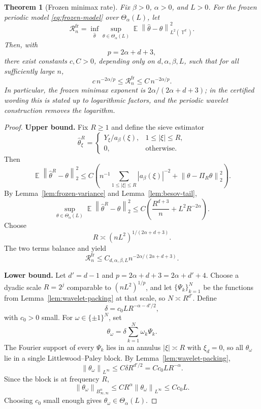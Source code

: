 \documentclass[12pt]{article}
\newtheorem{theorem}{Theorem}[section]
\theoremstyle{remark}
\DeclareMathOperator{\E}{\mathbb E}
\DeclareMathOperator{\T}{\mathbb T}
\newcommand{\norm}[1]{\left\lVert #1\right\rVert}
\newcommand{\asym}{\asymp}
\begin{document}
\begin{theorem}[Frozen minimax rate]
\label{thm:frozen-minimax}
Fix \(\beta>0\), \(\alpha>0\), and \(L>0\). For the frozen periodic model \eqref{eq:frozen-model} over \(\Theta_\alpha(L)\), let
\[
\mathcal R_n^{\mathrm{fr}}
=
\inf_{\widehat\theta}\sup_{\theta\in\Theta_\alpha(L)}
\E\norm{\widehat\theta-\theta}_{L^2(\T^d)}^2.
\]
Then, with
\[
p=2\alpha+d+3,
\]
there exist constants \(c,C>0\), depending only on \(d,\alpha,\beta,L\), such that for all sufficiently large \(n\),
\[
c\,n^{-2\alpha/p}
\le
\mathcal R_n^{\mathrm{fr}}
\le
C\,n^{-2\alpha/p}.
\]
In particular, the frozen minimax exponent is \(2\alpha/(2\alpha+d+3)\); in the certified wording this is stated up to logarithmic factors, and the periodic wavelet construction removes the logarithm.
\end{theorem}
\begin{proof}
\textbf{Upper bound.} Fix \(R\ge1\) and define the sieve estimator
\[
\widehat\theta^R_\xi=
\begin{cases}
Y_\xi/a_\beta(\xi), & 1\le|\xi|\le R,\\
0, & \text{otherwise}.
\end{cases}
\]
Then
\[
\E\norm{\widehat\theta^R-\theta}_2^2
\le
C\left(
n^{-1}\sum_{1\le|\xi|\le R}|a_\beta(\xi)|^{-2}
+
\norm{\theta-\Pi_R\theta}_2^2
\right).
\]
By Lemma~\ref{lem:frozen-variance} and Lemma~\ref{lem:besov-tail},
\[
\sup_{\theta\in\Theta_\alpha(L)}
\E\norm{\widehat\theta^R-\theta}_2^2
\le
C\left(
\frac{R^{d+3}}{n}
+
L^2R^{-2\alpha}
\right).
\]
Choose
\[
R\asym (nL^2)^{1/(2\alpha+d+3)}.
\]
The two terms balance and yield
\[
\mathcal R_n^{\mathrm{fr}}
\le
C_{d,\alpha,\beta,L}
n^{-2\alpha/(2\alpha+d+3)}.
\]

\textbf{Lower bound.} Let \(d'=d-1\) and \(p=2\alpha+d+3=2\alpha+d'+4\). Choose a dyadic scale \(R=2^j\) comparable to \((nL^2)^{1/p}\), and let \(\{\Psi_k\}_{k=1}^N\) be the functions from Lemma~\ref{lem:wavelet-packing} at that scale, so \(N\asym R^{d'}\). Define
\[
\delta=c_0 L R^{-\alpha-d'/2},
\]
with \(c_0>0\) small. For \(\omega\in\{\pm1\}^N\), set
\[
\theta_\omega=\delta\sum_{k=1}^N\omega_k\Psi_k.
\]
The Fourier support of every \(\Psi_k\) lies in an annulus \(|\xi|\asym R\) with \(\xi_d=0\), so all \(\theta_\omega\) lie in a single Littlewood--Paley block. By Lemma~\ref{lem:wavelet-packing},
\[
\norm{\theta_\omega}_{L^\infty}
\le
C\delta R^{d'/2}
=
C c_0 L R^{-\alpha}.
\]
Since the block is at frequency \(R\),
\[
\norm{\theta_\omega}_{B^\alpha_{\infty,\infty}}
\le
C R^\alpha\norm{\theta_\omega}_{L^\infty}
\le
C c_0 L.
\]
Choosing \(c_0\) small enough gives \(\theta_\omega\in\Theta_\alpha(L)\).


\end{proof}
\end{document}
